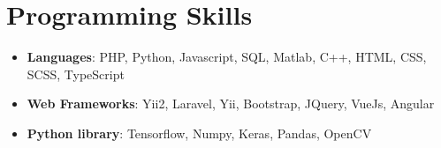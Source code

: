 \documentclass[letterpaper,11pt]{article}
\newcommand{\resumeSubHeadingListStart}{\begin{itemize}[leftmargin=*]}
\newcommand{\resumeSubHeadingListEnd}{\end{itemize}}
\begin{document}
%
\section{Programming Skills}
  \resumeSubHeadingListStart
    \item{
      \textbf{Languages}{: PHP, Python, Javascript, SQL, Matlab, C++, HTML, CSS, SCSS, TypeScript}
      \hfill
      }
    \item{
      \textbf{Web Frameworks}{: Yii2, Laravel, Yii, Bootstrap, JQuery, VueJs, Angular}
      \hfill
      }
    \item{
      \textbf{Python library}{: Tensorflow, Numpy, Keras, Pandas, OpenCV}
    }
  \resumeSubHeadingListEnd


\end{document}
